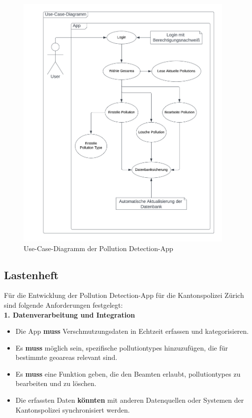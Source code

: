 \documentclass[a4paper,12pt]{article}
\begin{document}
\begin{figure}[h]
\centering
\includegraphics[width=0.95\textwidth]{bilder/use-case-diagramm.drawio.png}
\caption{Use-Case-Diagramm der \glqq Pollution Detection\grqq{}-App}
\end{figure}

\clearpage
\subsection{Lastenheft}
\label{sec:lastenheft}

Für die Entwicklung der \glqq Pollution Detection\grqq{}-App für die Kantonspolizei Zürich sind folgende Anforderungen festgelegt:\\

\noindent\textbf{1. Datenverarbeitung und Integration}

\begin{itemize}
    \item Die App \textbf{muss} Verschmutzungsdaten in Echtzeit erfassen und kategorisieren.
    \item Es \textbf{muss} möglich sein, spezifische \glspl{pollutiontype} hinzuzufügen, die für bestimmte \glspl{geoarea} relevant sind.
    \item Es \textbf{muss} eine Funktion geben, die den Beamten erlaubt, \glspl{pollutiontype} zu bearbeiten und zu löschen.
    \item Die erfassten Daten \textbf{könnten} mit anderen Datenquellen oder Systemen der Kantonspolizei synchronisiert werden.
\end{itemize}
\end{document}
